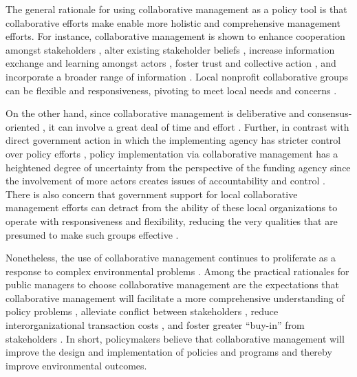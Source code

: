 \documentclass[11pt,a4paper,titlepage]{article}
\begin{document}
The general rationale for using collaborative management as a policy tool is that collaborative efforts make enable more holistic and comprehensive management efforts. For instance, collaborative management is shown to enhance cooperation amongst stakeholders \parencite{lubell2004}, alter existing stakeholder beliefs \parencite{leach2013}, increase information exchange and learning amongst actors \parencite{beierle2002,weible2009}, foster trust and collective action \parencite{lubell2005}, and incorporate a broader range of information \parencite{innes1999,wondolleck2000}. Local nonprofit collaborative groups can be flexible and responsiveness, pivoting to meet local needs and concerns \parencite{nikolic2008}.

On the other hand, since collaborative management is deliberative and consensus-oriented \parencite{ansell2008}, it can involve a great deal of time and effort \parencite{margerum2011}. Further, in contrast with direct government action in which the implementing agency has stricter control over policy efforts \parencite{salamon2002}, policy implementation via collaborative management has a heightened degree of uncertainty from the perspective of the funding agency since the involvement of more actors creates issues of accountability and control \parencite{weber2003}. There is also concern that government support for local collaborative management efforts can detract from the ability of these local organizations to operate with responsiveness and flexibility, reducing the very qualities that are presumed to make such groups effective \parencite{smith2004,nikolic2008}.

Nonetheless, the use of collaborative management continues to proliferate \parencite{ansell2008,emerson2012} as a response to complex environmental problems \parencite{margerum2011}. Among the practical rationales for public managers to choose collaborative management are the expectations that collaborative management will facilitate a more comprehensive understanding of policy problems \parencite{leach2013}, alleviate conflict between stakeholders \parencite{berardo2014}, reduce interorganizational transaction costs \parencite{emerson2012,scott2014}, and foster greater “buy-in” from stakeholders \parencite{ansell2008}. In short, policymakers believe that collaborative management will improve the design and implementation of policies and programs and thereby improve environmental outcomes.
\end{document}
